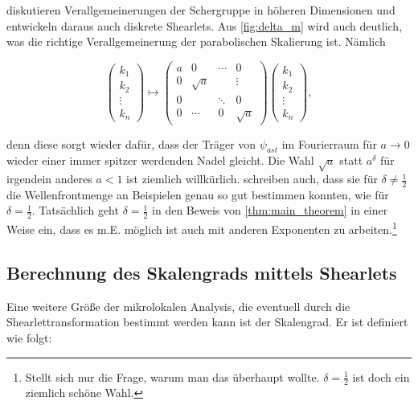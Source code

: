 \textcite{Guo2006} diskutieren Verallgemeinerungen der Schergruppe in höheren Dimensionen und entwickeln daraus auch diskrete Shearlets. Aus \cref{fig:delta_m} wird auch deutlich, was die richtige Verallgemeinerung der parabolischen Skalierung ist. Nämlich

\begin{equation*}
\begin{pmatrix}
k_1 \\ k_2 \\ \vdots \\ k_n
\end{pmatrix}
\mapsto
\begin{pmatrix}
	a & 0 		& \cdots & 0\\
	0 & \sqrt a & 		 & 	\vdots\\
	0 & 			& \ddots & 0 \\
	0 & \cdots  & 	0    & \sqrt{a}
\end{pmatrix}
\begin{pmatrix}
k_1 \\ k_2 \\ \vdots \\ k_n
\end{pmatrix},
\end{equation*}

denn diese sorgt wieder dafür, dass der Träger von $\psi_{ast}$ im Fourierraum für $a \to 0$ wieder einer immer spitzer werdenden Nadel gleicht. Die Wahl $\sqrt{a}$ statt $a^\delta$ für irgendein anderes $a<1$ ist ziemlich willkürlich. \textcite{Kutyniok2008} schreiben auch, dass sie für $\delta \neq \frac{1}{2}$ die Wellenfrontmenge an Beispielen genau so gut bestimmen konnten, wie für $\delta = \frac{1}{2}$. Tatsächlich geht $\delta = \frac{1}{2}$ in den Beweis von \cref{thm:main_theorem} in einer Weise ein, dass es m.E. möglich ist auch mit anderen Exponenten zu arbeiten.\footnote{Stellt sich nur die Frage, warum man das überhaupt wollte. $\delta = \frac{1}{2}$ ist doch ein ziemlich schöne Wahl.}

\subsection{Berechnung des Skalengrads mittels Shearlets}
\label{sec:scaling_degree}
Eine weitere Größe der mikrolokalen Analysis, die eventuell durch die Shearlettransformation bestimmt werden kann ist der Skalengrad. Er ist definiert wie folgt:

